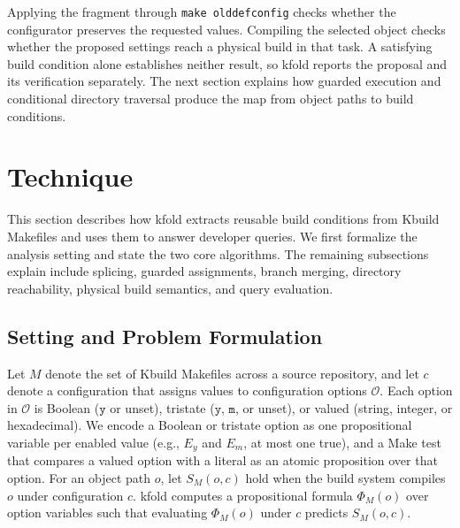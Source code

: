 \documentclass[acmsmall]{acmart}
\newcommand{\tool}{\textsf{kfold}\xspace}
\begin{document}
Applying the fragment through \texttt{make olddefconfig} checks whether the configurator preserves the requested values.
Compiling the selected object checks whether the proposed settings reach a physical build in that task.
A satisfying build condition alone establishes neither result, so \tool reports the proposal and its verification separately.
The next section explains how guarded execution and conditional directory traversal produce the map from object paths to build conditions.

\section{Technique}\label{sec:technique}

This section describes how \tool extracts reusable build conditions from Kbuild Makefiles and uses them to answer developer queries.
We first formalize the analysis setting and state the two core algorithms.
The remaining subsections explain include splicing, guarded assignments, branch merging, directory reachability, physical build semantics, and query evaluation.

\subsection{Setting and Problem Formulation}\label{sec:technique:setting}

Let $M$ denote the set of Kbuild Makefiles across a source repository, and let $c$ denote a configuration that assigns values to configuration options $\mathcal{O}$.
Each option in $\mathcal{O}$ is Boolean ($\texttt{y}$ or unset), tristate ($\texttt{y}$, $\texttt{m}$, or unset), or valued (string, integer, or hexadecimal).
We encode a Boolean or tristate option as one propositional variable per enabled value (e.g., $E_y$ and $E_m$, at most one true), and a Make test that compares a valued option with a literal as an atomic proposition over that option.
For an object path $o$, let $S_M(o, c)$ hold when the build system compiles $o$ under configuration $c$.
\tool computes a propositional formula $\Phi_M(o)$ over option variables such that evaluating $\Phi_M(o)$ under $c$ predicts $S_M(o, c)$.
\end{document}

